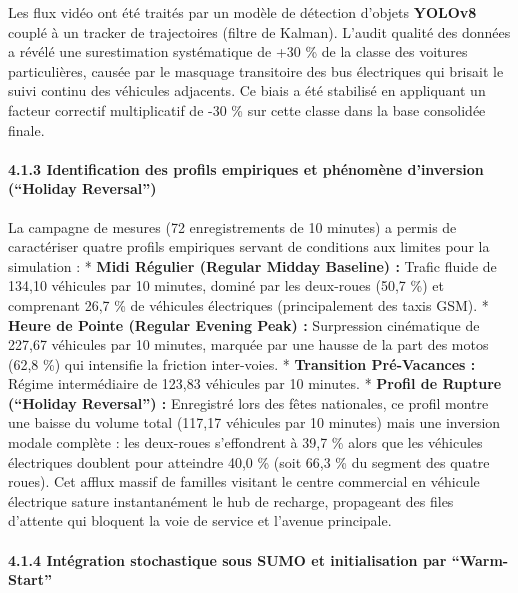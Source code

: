 \documentclass[10pt, a4paper]{article}
\begin{document}
Les flux vidéo ont été traités par un modèle de détection d'objets
\textbf{YOLOv8} couplé à un tracker de trajectoires (filtre de Kalman).
L'audit qualité des données a révélé une surestimation systématique de
+30 \% de la classe des voitures particulières, causée par le masquage
transitoire des bus électriques qui brisait le suivi continu des
véhicules adjacents. Ce biais a été stabilisé en appliquant un facteur
correctif multiplicatif de -30 \% sur cette classe dans la base
consolidée finale.

\paragraph{4.1.3 Identification des profils empiriques et phénomène
d'inversion (``Holiday
Reversal'')}\label{identification-des-profils-empiriques-et-phuxe9nomuxe8ne-dinversion-holiday-reversal}

La campagne de mesures (72 enregistrements de 10 minutes) a permis de
caractériser quatre profils empiriques servant de conditions aux limites
pour la simulation : * \textbf{Midi Régulier (Regular Midday Baseline)
:} Trafic fluide de 134,10 véhicules par 10 minutes, dominé par les
deux-roues (50,7 \%) et comprenant 26,7 \% de véhicules électriques
(principalement des taxis GSM). * \textbf{Heure de Pointe (Regular
Evening Peak) :} Surpression cinématique de 227,67 véhicules par 10
minutes, marquée par une hausse de la part des motos (62,8 \%) qui
intensifie la friction inter-voies. * \textbf{Transition Pré-Vacances :}
Régime intermédiaire de 123,83 véhicules par 10 minutes. *
\textbf{Profil de Rupture (``Holiday Reversal'') :} Enregistré lors des
fêtes nationales, ce profil montre une baisse du volume total (117,17
véhicules par 10 minutes) mais une inversion modale complète : les
deux-roues s'effondrent à 39,7 \% alors que les véhicules électriques
doublent pour atteindre 40,0 \% (soit 66,3 \% du segment des quatre
roues). Cet afflux massif de familles visitant le centre commercial en
véhicule électrique sature instantanément le hub de recharge, propageant
des files d'attente qui bloquent la voie de service et l'avenue
principale.

\paragraph{4.1.4 Intégration stochastique sous SUMO et initialisation
par
``Warm-Start''}\label{intuxe9gration-stochastique-sous-sumo-et-initialisation-par-warm-start}
\end{document}
